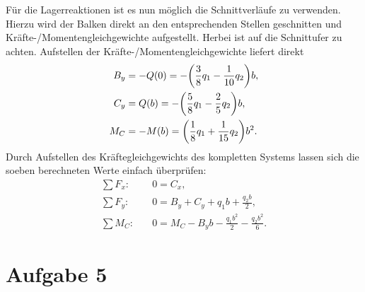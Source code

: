 \documentclass{exercise}
\begin{document}
    Für die Lagerreaktionen ist es nun möglich die Schnittverläufe zu verwenden.
    Hierzu wird der Balken direkt an den entsprechenden Stellen geschnitten und Kräfte-/Momentengleichgewichte aufgestellt.
    Herbei ist auf die Schnittufer zu achten.
    Aufstellen der Kräfte-/Momentengleichgewichte liefert direkt
    \begin{align*}
        B_y &= -Q\parentheses*{0} = -\parentheses*{\frac{3}{8}q_1 - \frac{1}{10}q_2}b,\\
        C_y &= Q\parentheses*{b} = -\parentheses*{\frac{5}{8}q_1 - \frac{2}{5}q_2}b,\\
        M_C &= -M\parentheses*{b} = \parentheses*{\frac{1}{8}q_1 + \frac{1}{15}q_2}b^2.
    \end{align*}
    Durch Aufstellen des Kräftegleichgewichts des kompletten Systems lassen sich die soeben berechneten Werte einfach überprüfen:
    \begin{align*}
        \sum F_x: &\quad 0 = C_x,\\
        \sum F_y: &\quad 0 = B_y + C_y + q_1 b + \frac{q_2 b}{2},\\
        \sum M_C: &\quad 0 = M_C - B_y b - \frac{q_1 b^2}{2} - \frac{q_2 b^2}{6}.
    \end{align*}


    \section*{Aufgabe 5}
\end{document}
